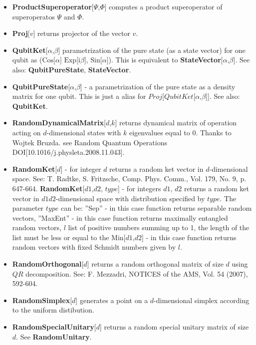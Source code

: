 \begin{itemize}
\item  \textbf{ProductSuperoperator}[$\Psi$,$\Phi$] computes a product superoperator of superoperatos $\Psi$ and $\Phi$.
\item  \textbf{Proj}[$v$] returns projector of the vector $v$.
\item  \textbf{QubitKet}[$\alpha$,$\beta$] parametrization of the pure state (as a state vector) for one qubit as ($\text{Cos[$\alpha $] Exp[i$\beta $], Sin[$\alpha $]}$). This is equivalent to \textbf{StateVector}[{$\text{$\alpha $,$\beta $}$}]. See also: \textbf{QubitPureState}, \textbf{StateVector}.
\item  \textbf{QubitPureState}[$\text{$\alpha $,$\beta $}$] - a parametrization of the pure state as a density matrix for one qubit. This is just a alias for $Proj$[$QubitKet$[$\text{$\alpha $,$\beta $}$]]. See also: \textbf{QubitKet}.
\item  \textbf{RandomDynamicalMatrix}[$d$,$k$] returns dynamical matrix of operation acting on $d$-dimensional states with $k$ eigenvalues equal to 0. Thanks to Wojtek Bruzda. see Random Quantum Operations DOI[10.1016/j.physleta.2008.11.043].
\item  \textbf{RandomKet}[$d$] - for integer $d$ returns a random ket vector in $d$-dimensional space. See: T. Radtke, S. Fritzsche, Comp. Phys. Comm., Vol. 179, No. 9, p. 647-664. \newline{}
\textbf{RandomKet}[{$d1$,$d2$}, $type$] - for integers $d1$, $d2$ returns a random ket vector in $d1 d2$-dimensional space with distribution specified by $type$. \newline{}
The parameter $type$ can be:\newline{}
\indent{} ''Sep'' - in this case function returns separable random vectors,\newline{}
\indent{} ''MaxEnt'' - in this case function returns maximally entangled random vectors,\newline{}
\indent{} $l$ list of positive numbers summing up to 1, the length of the list must be less or equal to the Min[$d1$,$d2$] - in this case function returns random vectors with fixed Schmidt numbers given by $l$.
\item  \textbf{RandomOrthogonal}[$d$] returns a random orthogonal matrix of size $d$ using $QR$ decomposition. See: F. Mezzadri, NOTICES of the AMS, Vol. 54 (2007), 592-604.
\item  \textbf{RandomSimplex}[$d$] generates a point on a $d$-dimensional simplex according to the uniform distibution.
\item  \textbf{RandomSpecialUnitary}[$d$] returns a random special unitary matrix of size $d$. See \textbf{RandomUnitary}.

\end{itemize}
